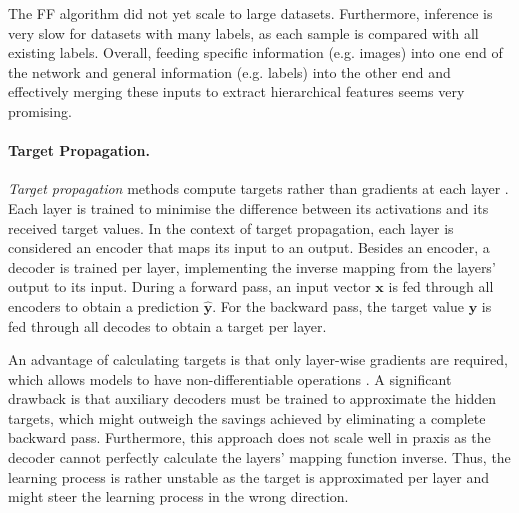 The FF algorithm did not yet scale to large datasets. Furthermore, inference is very slow for datasets with many labels, as each sample is compared with all existing labels. Overall, feeding specific information (e.g. images) into one end of the network and general information (e.g. labels) into the other end and effectively merging these inputs to extract hierarchical features seems very promising.

\paragraph{Target Propagation.} \emph{Target propagation} methods compute targets rather than gradients at each layer .
Each layer is trained to minimise the difference between its activations and its received target values.
In the context of target propagation, each layer is considered an encoder that maps its input to an output. Besides an encoder, a decoder is trained per layer, implementing the inverse mapping from the layers' output to its input.
During a forward pass, an input vector $\boldsymbol{x}$ is fed through all encoders to obtain a prediction $\boldsymbol{\hat{y}}$. For the backward pass, the target value $\boldsymbol{y}$ is fed through all decodes to obtain a target per layer.


An advantage of calculating targets is that only layer-wise gradients are required, which allows models to have non-differentiable operations \cite{appice_difference_2015}.
A significant drawback is that auxiliary decoders must be trained to approximate the hidden targets, which might outweigh the savings achieved by eliminating a complete backward pass.
Furthermore, this approach does not scale well in praxis as the decoder cannot perfectly calculate the layers' mapping function inverse. 
Thus, the learning process is rather unstable as the target is approximated per layer and might steer the learning process in the wrong direction.



